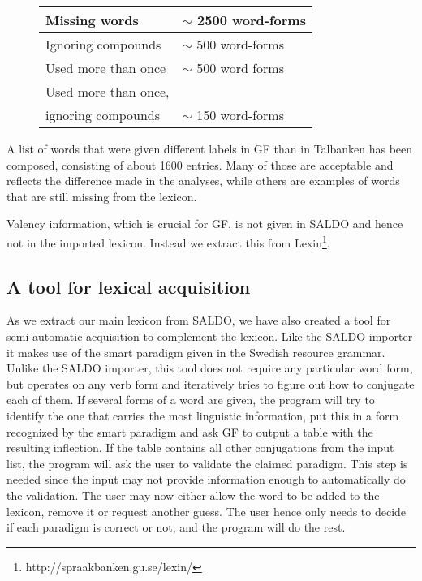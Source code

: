 \documentclass[10pt, a4paper]{article}
\begin{document}
\begin{figure}[h]
\begin{tabular}{|l|l|}
\hline
Missing words &$\sim$ 2500 word-forms\\
\hline
\hline
Ignoring compounds & $\sim$ 500 word-forms\\
Used more than once & $\sim$ 500 word forms\\
Used more than once,& \\
\hspace{2mm} ignoring compounds & $\sim$ 150 word-forms\\
\hline
\end{tabular}
\caption{}
\end{figure}

A list of words that were given different labels in GF than in Talbanken has been
composed, consisting of about 1600 entries. Many of those are
acceptable and reflects the difference 
made in the analyses, while
others are examples of words that are still missing from
the lexicon.

\noindent Valency information, which is crucial for GF, is not given in SALDO and
hence not in the imported lexicon. Instead we extract this from
Lexin\footnote{http://spraakbanken.gu.se/lexin/}.


\subsection{A tool for lexical acquisition}
As we extract our main lexicon from SALDO, we have also created a tool for
semi-automatic acquisition to complement the lexicon.
Like the SALDO importer it makes use of
the smart paradigm given in the Swedish resource grammar.
Unlike the SALDO importer, this tool does not require any particular
word form, but operates on any verb form and 
iteratively tries to figure out how to conjugate each of them. If several forms
of a word are 
given, the program will try to identify the one that carries the most linguistic
information, put this in a form recognized by the smart paradigm and ask GF to output
a table with the resulting inflection. 
If the table contains all other conjugations from the input list,
the program will ask the  user to
validate the claimed paradigm. 
This step is needed since the input may not provide information enough
to automatically do the validation. The user may now either
allow the word to be added to the lexicon, remove it or request another guess.
The user hence only needs to decide if each paradigm is correct or not, and
the program will do the rest.
\end{document}
